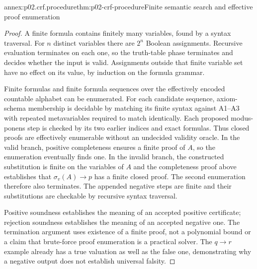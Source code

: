 \begin{annexitem}{annex:p02.crf.procedure}{thm:p02-crf-procedure}{Finite semantic search and effective proof enumeration}
\begin{proof}
A finite formula contains finitely many variables, found by a syntax
traversal. For \(n\) distinct variables there are \(2^n\)
Boolean assignments. Recursive evaluation terminates on each one,
so the truth-table phase terminates and decides whether the input
is valid. Assignments outside that finite variable set have no
effect on its value, by induction on the formula grammar.

Finite formulas and finite formula sequences over the effectively
encoded countable alphabet can be enumerated. For each candidate
sequence, axiom-schema membership is decidable by matching its finite
syntax against A1--A3 with repeated metavariables required to match
identically. Each proposed modus-ponens step is checked by its two
earlier indices and exact formulas. Thus closed proofs are
effectively enumerable without an undecided validity oracle.
In the valid branch, positive completeness ensures a finite proof
of \(A\), so the enumeration eventually finds one. In the
invalid branch, the constructed substitution is finite on the
variables of \(A\) and the completeness proof above establishes
that \(\sigma_v(A)\to p\) has a finite closed proof. The
second enumeration therefore also terminates. The appended
negative steps are finite and their substitutions are checkable
by recursive syntax traversal.

Positive soundness establishes the meaning of an accepted positive
certificate; rejection soundness establishes the meaning of an
accepted negative one. The termination argument uses existence
of a finite proof, not a polynomial bound or a claim that brute-force
proof enumeration is a practical solver. The \(q\to r\) example
already has a true valuation as well as the false one, demonstrating
why a negative output does not establish universal falsity.
\end{proof}
\end{annexitem}

